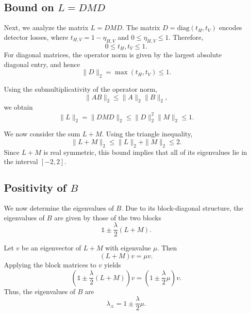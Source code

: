 \documentclass[%
 reprint,
 amsmath,amssymb,
 aps,
twocolumn
]{revtex4-2}
\begin{document}
\subsection{Bound on $L = DMD$}

Next, we analyze the matrix $L = DMD$. The matrix $D = \mathrm{diag}(t_H, t_V)$ encodes detector losses, where $t_{H,V} = 1 - \eta_{H,V}$ and $0 \le \eta_{H,V} \le 1$. Therefore,
\begin{equation}
0 \le t_H, t_V \le 1.
\end{equation}
For diagonal matrices, the operator norm is given by the largest absolute diagonal entry, and hence
\begin{equation}
\|D\|_2 = \max(t_H, t_V) \le 1.
\end{equation}

Using the submultiplicativity of the operator norm,
\begin{equation}
\|AB\|_2 \le \|A\|_2 \|B\|_2,
\end{equation}
we obtain
\begin{equation}
\|L\|_2 = \|DMD\|_2 \le \|D\|_2^2 \|M\|_2 \le 1.
\end{equation}

We now consider the sum $L + M$. Using the triangle inequality,
\begin{equation}
\|L + M\|_2 \le \|L\|_2 + \|M\|_2 \le 2.
\end{equation}
Since $L+M$ is real symmetric, this bound implies that all of its eigenvalues lie in the interval $[-2,2]$.

\subsection{Positivity of $B$}

We now determine the eigenvalues of $B$. Due to its block-diagonal structure, the eigenvalues of $B$ are given by those of the two blocks
\begin{equation}
\mathbb{1} \pm \frac{\lambda}{2}(L+M).
\end{equation}

Let $v$ be an eigenvector of $L+M$ with eigenvalue $\mu$. Then
\begin{equation}
(L+M)v = \mu v.
\end{equation}
Applying the block matrices to $v$ yields
\begin{equation}
\left(\mathbb{1} \pm \frac{\lambda}{2}(L+M)\right)v
= \left(1 \pm \frac{\lambda}{2}\mu\right)v.
\end{equation}
Thus, the eigenvalues of $B$ are
\begin{equation}
\lambda_\pm = 1 \pm \frac{\lambda}{2}\mu.
\end{equation}
\end{document}
